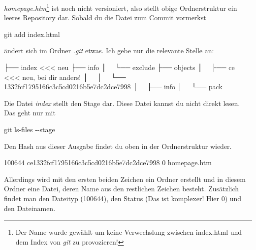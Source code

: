 \documentclass[
  letterpaper,
  DIV=11]{scrreprt}
\newenvironment{Shaded}{\begin{snugshade}}{\end{snugshade}}
\newcommand{\AttributeTok}[1]{\textcolor[rgb]{0.40,0.45,0.13}{#1}}
\newcommand{\ExtensionTok}[1]{\textcolor[rgb]{0.00,0.23,0.31}{#1}}
\newcommand{\FunctionTok}[1]{\textcolor[rgb]{0.28,0.35,0.67}{#1}}
\newcommand{\NormalTok}[1]{\textcolor[rgb]{0.00,0.23,0.31}{#1}}
\newcommand{\OperatorTok}[1]{\textcolor[rgb]{0.37,0.37,0.37}{#1}}
\newcommand{\git}{\textit{git}\xspace}
\newcommand{\datei}[1]{\textit{#1}\xspace}
\begin{document}
\datei{homepage.htm}\footnote{Der Name wurde gewählt um keine
  Verwechslung zwischen index.html und dem Index von \git zu
  provozieren!} ist noch nicht versioniert, also stellt obige
Ordnerstruktur ein leeres Repository dar. Sobald du die Datei zum Commit
vormerkst

\begin{Shaded}
\begin{Highlighting}[]
\FunctionTok{git}\NormalTok{ add index.html }
\end{Highlighting}
\end{Shaded}

ändert sich im Ordner \emph{.git} etwas. Ich gebe nur die relevante
Stelle an:

\begin{Shaded}
\begin{Highlighting}[]
\ExtensionTok{├──}\NormalTok{ index            }\OperatorTok{\textless{}\textless{}\textless{}}\NormalTok{ neu }
\ExtensionTok{├──}\NormalTok{ info}
\ExtensionTok{│  }\NormalTok{ └── exclude}
\ExtensionTok{├──}\NormalTok{ objects}
\ExtensionTok{│  }\NormalTok{ ├── ce          }\OperatorTok{\textless{}\textless{}\textless{}}\NormalTok{ neu, bei dir anders! }
\ExtensionTok{│  }\NormalTok{ │   └── 1332fcf1795166c3c5cd0216b5e7dc2dce7998}
\ExtensionTok{│  }\NormalTok{ ├── info}
\ExtensionTok{│  }\NormalTok{ └── pack}
\end{Highlighting}
\end{Shaded}

Die Datei \emph{index} stellt den Stage dar. Diese Datei kannst du nicht
direkt lesen. Das geht nur mit

\begin{Shaded}
\begin{Highlighting}[]
\FunctionTok{git}\NormalTok{ ls{-}files }\AttributeTok{{-}{-}stage} 
\end{Highlighting}
\end{Shaded}

Den Hash aus dieser Ausgabe findet du oben in der Ordnerstruktur wieder.

\begin{Shaded}
\begin{Highlighting}[]
\ExtensionTok{100644}\NormalTok{ ce1332fcf1795166c3c5cd0216b5e7dc2dce7998 0   homepage.htm}
\end{Highlighting}
\end{Shaded}

Allerdings wird mit den ersten beiden Zeichen ein Ordner erstellt und in
diesem Ordner eine Datei, deren Name aus den restlichen Zeichen besteht.
Zusätzlich findet man den Dateityp (100644), den Status (Das ist
komplexer! Hier 0) und den Dateinamen.
\end{document}
